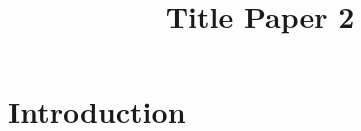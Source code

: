 \title{Title Paper 2}
\maketitle
\label{pap:02}

\begin{abstract}
\kant[1-2] 
\end{abstract}

\startcontents[chapters]

\section{Introduction} 
\kant[1-2] 






\printbibliography[heading = subbibliography]
\stopcontents[chapters]
